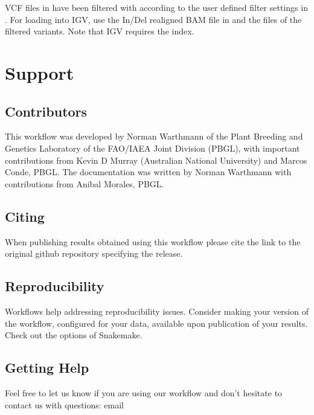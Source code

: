\documentclass[letterpaper,10pt,english]{sphinxhowto}
\begin{document}
VCF files in  have been filtered with  according to the user defined filter settings in .
For loading into IGV, use the In/Del realigned BAM file in  and the  files of the filtered variants. Note that IGV requires the  index.


\section{Support}
\label{\detokenize{index:support}}

\subsection{Contributors}
\label{\detokenize{index:contributors}}
This workflow was developed by Norman Warthmann of the Plant Breeding and Genetics Laboratory of the FAO/IAEA Joint Division (PBGL), with important contributions from Kevin D Murray (Australian National University) and Marcos Conde, PBGL. The documentation was written by Norman Warthmann with contributions from Anibal Morales, PBGL.


\subsection{Citing}
\label{\detokenize{index:citing}}
When publishing results obtained using this workflow please cite the link to the original github repository specifying the release.


\subsection{Reproducibility}
\label{\detokenize{index:reproducibility}}
Workflows help addressing reproducibility issues. Consider making your version of the workflow, configured for your data, available upon publication of your results. Check out the  options of Snakemake.


\subsection{Getting Help}
\label{\detokenize{index:getting-help}}
Feel free to let us know if you are using our workflow and don’t hesitate to contact us with questions: email 



\renewcommand{\indexname}{Index}
\printindex
\end{document}
